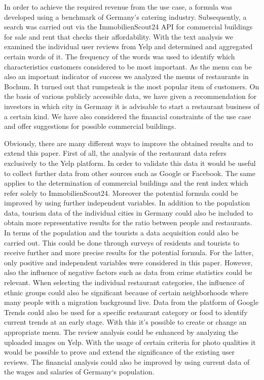 In order to achieve the required revenue from the use case, a formula was developed using a benchmark of Germany's catering industry. Subsequently, a search was carried out via the ImmobilienScout24 \ac{API} for commercial buildings for sale and rent that checks their affordability.
With the text analysis we examined the individual user reviews from Yelp and determined and aggregated certain words of it. The frequency of the words was used to identify which characteristics customers considered to be most important.
As the menu can be also an important indicator of success we analyzed the menus of restaurants in Bochum. It turned out that rumpsteak is the most popular item of customers. \newline
On the basis of various publicly accessible data, we have given a recommendation for investors in which city in Germany it is advisable to start a restaurant business of a certain kind. We have also considered the financial constraints of the use case and offer suggestions for possible commercial buildings.

Obviously, there are many different ways to improve the obtained results and to extend this paper. First of all, the analysis of the restaurant data refers exclusively to the Yelp platform. In order to validate this data it would be useful to collect further data from other sources such as Google or Facebook. The same applies to the determination of commercial buildings and the rent index which refer solely to ImmobilienScout24. \newline
Moreover the potential formula could be improved by using further independent variables. In addition to the population data, tourism data of the individual cities in Germany could also be included to obtain more representative results for the ratio between people and restaurants. In terms of the population and the tourists a data acquisition could also be carried out. This could be done through surveys of residents and tourists to receive further and more precise results for the potential formula. For the latter, only positive and independent variables were considered in this paper. However, also the influence of negative factors such as data from crime statistics could be relevant. \newline
When selecting the individual restaurant categories, the influence of ethnic groups could also be significant because of certain neighborhoods where many people with a migration background live. Data from the platform of Google Trends could also be used for a specific restaurant category or food to identify current trends at an early stage. With this it's possible to create or change an appropriate menu. \newline
The review analysis could be enhanced by analyzing the uploaded images on Yelp. With the usage of certain criteria for photo qualities it would be possible to prove and extend the significance of the existing user reviews. The financial analysis could also be improved by using current data of the wages and salaries of Germany‘s population.